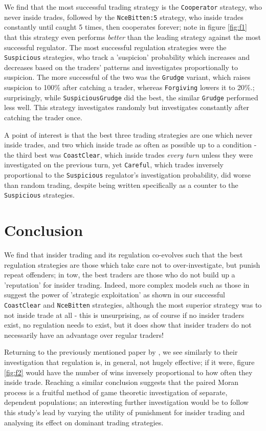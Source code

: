 \documentclass{article}
\begin{document}
We find that the most successful trading strategy is the \texttt{Cooperator} strategy, who never inside trades, followed by the \texttt{NceBitten:5} strategy, who inside trades constantly until caught 5 times, then cooperates forever; note in figure \ref{fig:f1} that this strategy even performs \emph{better} than the leading strategy against the most successful regulator. The most successful regulation strategies were the \texttt{Suspicious} strategies, who track a 'suspicion' probability which increases and decreases based on the traders' patterns and investigates proportionally to suspicion. The more successful of the two was the \texttt{Grudge} variant, which raises suspicion to 100\% after catching a trader, whereas \texttt{Forgiving} lowers it to 20\%.; surprisingly, while \texttt{SuspiciousGrudge} did the best, the similar \texttt{Grudge} performed less well. This strategy investigates randomly but investigates constantly after catching the trader once.

A point of interest is that the best three trading strategies are one which never inside trades, and two which inside trade as often as possible up to a condition - the third best was \texttt{CoastClear}, which inside trades \emph{every turn} unless they were investigated on the previous turn, yet \texttt{Careful}, which trades inversely proportional to the \texttt{Suspicious} regulator's investigation probability, did worse than random trading, despite being written specifically as a counter to the \texttt{Suspicious} strategies.

\section{Conclusion}
We find that insider trading and its regulation co-evolves such that the best regulation strategies are those which take care not to over-investigate, but punish repeat offenders; in tow, the best traders are those who do not build up a 'reputation' for insider trading. Indeed, more complex models such as those in \citet{kyle1985continuous} suggest the power of 'strategic exploitation' as shown in our successful \texttt{CoastClear} and \texttt{NceBitten} strategies, although the most superior strategy was to not inside trade at all - this is unsurprising, as of course if no insider traders exist, no regulation needs to exist, but it does show that insider traders do not necessarily have an advantage over regular traders!

Returning to the previously mentioned paper by \citet{smales2017game}, we see similarly to their investigation that regulation is, in general, not hugely effective; if it were, figure \ref{fig:f2} would have the number of wins inversely proportional to how often they inside trade. Reaching a similar conclusion suggests that the paired Moran process is a fruitful method of game theoretic investigation of separate, dependent populations; an interesting further investigation would be to follow this study's lead by varying the utility of punishment for insider trading and analysing its effect on dominant trading strategies.

\end{document}
